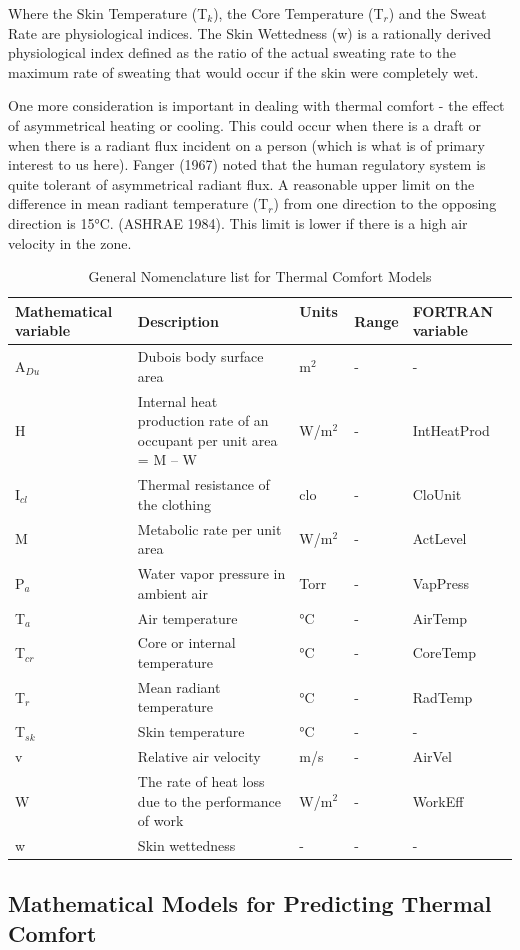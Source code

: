 Where the Skin Temperature (T\(_{k}\)), the Core Temperature (T\(_{r}\)) and the Sweat Rate are physiological indices. The Skin Wettedness (w) is a rationally derived physiological index defined as the ratio of the actual sweating rate to the maximum rate of sweating that would occur if the skin were completely wet.

One more consideration is important in dealing with thermal comfort - the effect of asymmetrical heating or cooling. This could occur when there is a draft or when there is a radiant flux incident on a person (which is what is of primary interest to us here). Fanger (1967) noted that the human regulatory system is quite tolerant of asymmetrical radiant flux. A reasonable upper limit on the difference in mean radiant temperature (T\(_{r}\)) from one direction to the opposing direction is 15°C. (ASHRAE 1984). This limit is lower if there is a high air velocity in the zone.

\begin{longtable}[c]{p{1.2in}p{2.0in}p{0.8in}p{0.8in}p{1.2in}}
\caption{  General Nomenclature list for Thermal Comfort Models \protect \label{table:general-nomenclature-list-for-thermal-comfort}}\\
\toprule 
Mathematical variable & Description & Units ~ & Range & FORTRAN variable \tabularnewline \midrule
\endhead
A\(_{Du}\) & Dubois body surface area & m\(^{2}\) & - & - \tabularnewline
H & Internal heat production rate of an occupant per unit area = M – W & W/m\(^{2}\) & - & IntHeatProd \tabularnewline
I\(_{cl}\) & Thermal resistance of the clothing & clo & - & CloUnit \tabularnewline
M & Metabolic rate per unit area & W/m\(^{2}\) & - & ActLevel \tabularnewline
P\(_{a}\) & Water vapor pressure in ambient air & Torr & - & VapPress \tabularnewline
T\(_{a}\) & Air temperature & °C & - & AirTemp \tabularnewline
T\(_{cr}\) & Core or internal temperature & °C & - & CoreTemp \tabularnewline
T\(_{r}\) & Mean radiant temperature & °C & - & RadTemp \tabularnewline
T\(_{sk}\) & Skin temperature & °C & - & - \tabularnewline
v & Relative air velocity & m/s & - & AirVel \tabularnewline
W & The rate of heat loss due to the performance of work & W/m\(^{2}\) & - & WorkEff \tabularnewline
w & Skin wettedness & - & - & - \tabularnewline
\bottomrule
\end{longtable}

\subsection{Mathematical Models for Predicting Thermal Comfort}\label{mathematical-models-for-predicting-thermal-comfort}

